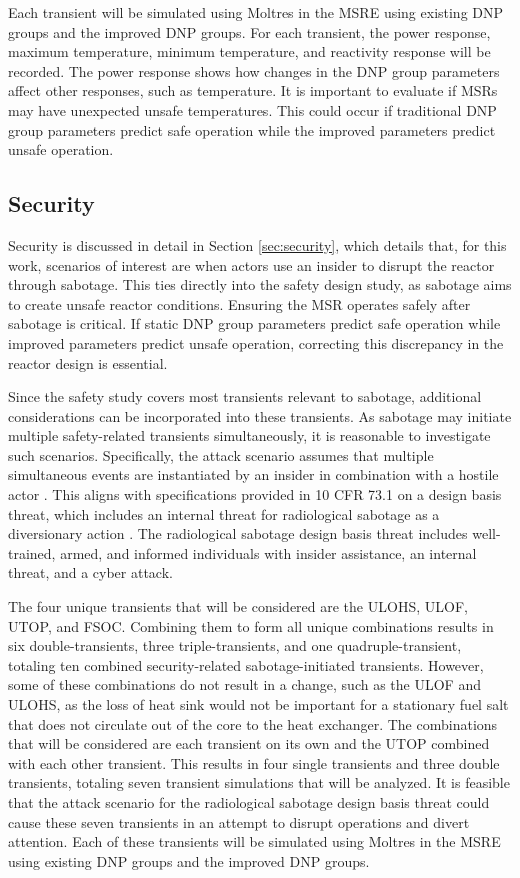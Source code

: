Each transient will be simulated using Moltres in the \gls{MSRE} using existing \gls{DNP} groups and the improved \gls{DNP} groups.
For each transient, the power response, maximum temperature, minimum temperature, and reactivity response will be recorded.
The power response shows how changes in the \gls{DNP} group parameters affect other responses, such as temperature.
It is important to evaluate if \glspl{MSR} may have unexpected unsafe temperatures.
This could occur if traditional \gls{DNP} group parameters predict safe operation while the improved parameters predict unsafe operation.

\subsection{Security}
Security is discussed in detail in Section \ref{sec:security}, which details that, for this work, scenarios of interest are when actors use an insider to disrupt the reactor through sabotage.
This ties directly into the safety design study, as sabotage aims to create unsafe reactor conditions.
Ensuring the \gls{MSR} operates safely after sabotage is critical.
If static \gls{DNP} group parameters predict safe operation while improved parameters predict unsafe operation, correcting this discrepancy in the reactor design is essential.

Since the safety study covers most transients relevant to sabotage, additional considerations can be incorporated into these transients.
As sabotage may initiate multiple safety-related transients simultaneously, it is reasonable to investigate such scenarios.
Specifically, the attack scenario assumes that multiple simultaneous events are instantiated by an insider in combination with a hostile actor \cite{iaea_national_2021}.
This aligns with specifications provided in 10 CFR 73.1 on a design basis threat, which includes an internal threat for radiological sabotage as a diversionary action \cite{CFR2022}.
The radiological sabotage design basis threat includes well-trained, armed, and informed individuals with insider assistance, an internal threat, and a cyber attack.

The four unique transients that will be considered are the \gls{ULOHS}, \gls{ULOF}, \gls{UTOP}, and \gls{FSOC}.
Combining them to form all unique combinations results in six double-transients, three triple-transients, and one quadruple-transient, totaling ten combined security-related sabotage-initiated transients.
However, some of these combinations do not result in a change, such as the \gls{ULOF} and \gls{ULOHS}, as the loss of heat sink would not be important for a stationary fuel salt that does not circulate out of the core to the heat exchanger.
The combinations that will be considered are each transient on its own and the \gls{UTOP} combined with each other transient.
This results in four single transients and three double transients, totaling seven transient simulations that will be analyzed.
It is feasible that the attack scenario for the radiological sabotage design basis threat could cause these seven transients in an attempt to disrupt operations and divert attention.
Each of these transients will be simulated using Moltres in the \gls{MSRE} using existing \gls{DNP} groups and the improved \gls{DNP} groups.

